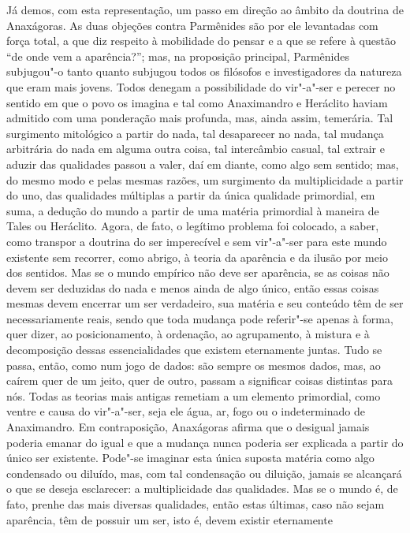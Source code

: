 Já demos, com esta representação, um passo em direção ao âmbito da doutrina
de Anaxágoras. As duas objeções contra Parmênides são por ele
levantadas com força total, a que diz respeito à mobilidade do pensar e
a que se refere à questão ``de onde vem a aparência?''; mas, na
proposição principal, Parmênides subjugou"-o tanto quanto subjugou todos
os filósofos e investigadores da natureza que eram mais jovens.
Todos denegam a possibilidade do vir"-a"-ser e perecer no sentido em que
o povo os imagina e tal como Anaximandro e Heráclito haviam admitido
com uma ponderação mais profunda, mas, ainda assim, temerária. Tal
surgimento mitológico a partir do nada, tal desaparecer no nada, tal mudança
arbitrária do nada em alguma outra coisa, tal intercâmbio casual, tal
extrair e aduzir das qualidades passou a valer, daí em diante, como
algo sem sentido; mas, do mesmo modo e pelas mesmas razões, um surgimento da
multiplicidade a partir do uno, das qualidades múltiplas a partir da
única qualidade primordial, em suma, a dedução do mundo a partir de uma
matéria primordial à maneira de Tales ou Heráclito. Agora, de fato, o
legítimo problema foi colocado, a saber, como transpor a doutrina do
ser imperecível e sem vir"-a"-ser para este mundo existente sem recorrer,
como abrigo, à teoria da aparência e da ilusão por meio dos sentidos.
Mas se o mundo empírico não deve ser aparência, se as coisas não devem
ser deduzidas do nada e menos ainda de algo único, então essas coisas
mesmas devem encerrar um ser verdadeiro, sua matéria e seu conteúdo têm
de ser necessariamente reais, sendo que toda mudança pode referir"-se
apenas à forma, quer dizer, ao posicionamento, à ordenação, ao
agrupamento, à mistura e à decomposição dessas essencialidades que
existem eternamente juntas. Tudo se passa, então, como num jogo de
dados: são sempre os mesmos dados, mas, ao caírem quer de um jeito,
quer de outro, passam a significar coisas distintas para nós. Todas as
teorias mais antigas remetiam a um elemento primordial, como ventre e
causa do vir"-a"-ser, seja ele água, ar, fogo ou o indeterminado de
Anaximandro. Em contraposição, Anaxágoras afirma que o desigual jamais
poderia emanar do igual e que a mudança nunca poderia ser explicada a
partir do único ser existente. Pode"-se imaginar esta única suposta
matéria como algo condensado ou diluído, mas, com tal condensação ou
diluição, jamais se alcançará o que se deseja esclarecer: a
multiplicidade das qualidades. Mas se o mundo é, de fato, prenhe das
mais diversas qualidades, então estas últimas, caso não sejam
aparência, têm de possuir um ser, isto é, devem existir eternamente

